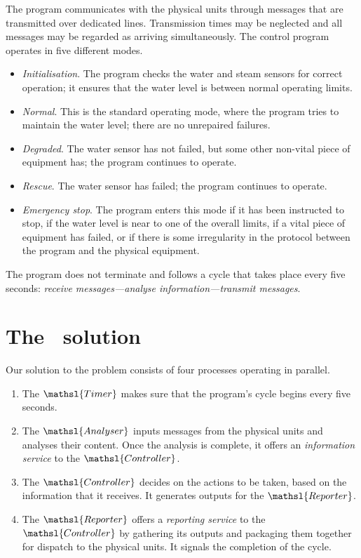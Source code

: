 \documentclass{report}
\newcommand{\compresslist}{\itemsep=0pt \parskip=0pt}
\begin{document}
The program communicates with the physical units through messages that
are transmitted over dedicated lines.  Transmission times may be
neglected and all messages may be regarded as arriving simultaneously.
The control program operates in five different modes.
\begin{itemize}\compresslist
\item \emph{Initialisation}.  The program checks the water and steam
  sensors for correct operation; it ensures that the water level is
  between normal operating limits.
\item \emph{Normal}.  This is the standard operating mode, where the
  program tries to maintain the water level; there are no unrepaired
  failures.
\item \emph{Degraded}.  The water sensor has not failed, but some
  other non-vital piece of equipment has; the program continues to
  operate.
\item \emph{Rescue}.  The water sensor has failed; the program
  continues to operate.
\item \emph{Emergency stop}.  The program enters this mode if it has
  been instructed to stop, if the water level is near to one of the
  overall limits, if a vital piece of equipment has failed, or if
  there is some irregularity in the protocol between the program and
  the physical equipment.
\end{itemize}
The program does not terminate and follows a cycle that takes place
every five seconds: \emph{receive messages---analyse
  information---transmit messages}.

\section{The \Circus\ solution}

Our solution to the problem consists of four processes operating in
parallel.
\begin{enumerate}\compresslist
\item The \textbf{\( \mathsl{Timer} \)}\/ makes sure that the
  program's cycle begins every five seconds.
\item The \textbf{\( \mathsl{Analyser} \)}\/ inputs messages from the
  physical units and analyses their content.  Once the analysis is
  complete, it offers an \emph{information service} to the \(
  \mathsl{Controller} \).
\item The \textbf{\( \mathsl{Controller} \)}\/ decides on the actions
  to be taken, based on the information that it receives.  It
  generates outputs for the \( \mathsl{Reporter} \).
\item The \textbf{\( \mathsl{Reporter} \)}\/ offers a \emph{reporting
    service} to the \( \mathsl{Controller} \)\/ by gathering its
  outputs and packaging them together for dispatch to the physical
  units.  It signals the completion of the cycle.
\end{enumerate}
\end{document}
